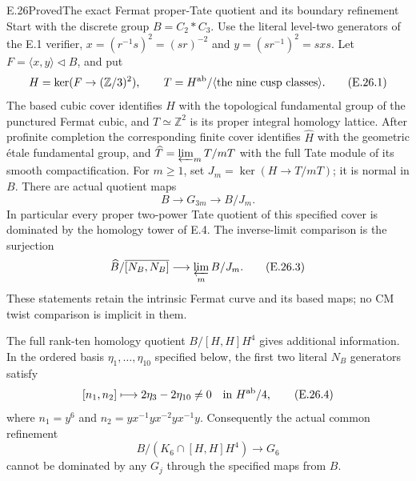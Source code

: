 \begin{statement}{E.26}{Proved}{The exact Fermat proper-Tate quotient and its boundary refinement}
Start with the discrete group $B=C_2*C_3$.  Use the literal
level-two generators of the E.1 verifier,
$x=(r^{-1}s)^2=(sr)^{-2}$ and $y=(sr^{-1})^2=sxs$.
Let $F=\langle x,y\rangle\triangleleft B$, and put
\[
 H=\ker(F\to(\mathbb Z/3)^2),\qquad
 T=H^{\rm ab}/\langle\text{the nine cusp classes}\rangle.
 \tag{E.26.1}
\]
The based cubic cover identifies $H$ with the topological
fundamental group of the punctured Fermat cubic, and
$T\simeq\mathbb Z^2$ is its proper integral homology lattice.
After profinite completion the corresponding finite cover
identifies $\widehat H$ with the geometric \'etale fundamental
group, and $\widehat T=\varprojlim_m T/mT$
with the full Tate module of its smooth compactification.
For $m\ge1$, set $J_m=\ker(H\to T/mT)$; it is normal in $B$.
There are actual quotient maps
\[
       B\longrightarrow G_{3m}\longrightarrow B/J_m.
 \tag{E.26.2}
\]
In particular every proper two-power Tate quotient of this
specified cover is dominated by the homology tower of E.4.
The inverse-limit comparison is the surjection
\[
       \widehat B/\overline{[N_B,N_B]}
            \longrightarrow\varprojlim_m B/J_m.
 \tag{E.26.3}
\]
These statements retain the intrinsic Fermat curve and its
based maps; no CM twist comparison is implicit in them.

The full rank-ten homology quotient
$B/[H,H]H^4$ gives additional information.  In the ordered
basis $\eta_1,\ldots,\eta_{10}$ specified below, the first two
literal $N_B$ generators satisfy
\[
 [n_1,n_2]\longmapsto2\eta_3-2\eta_{10}\ne0
            \quad\hbox{in }H^{\rm ab}/4,
 \tag{E.26.4}
\]
where $n_1=y^6$ and $n_2=yx^{-1}yx^{-2}yx^{-1}y$.
Consequently the actual common refinement
\[
     B/(K_6\cap[H,H]H^4)\longrightarrow G_6
 \tag{E.26.5}
\]
cannot be dominated by any $G_j$ through the specified maps
from $B$.
\end{statement}
